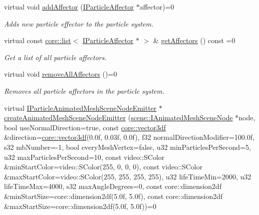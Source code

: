 \begin{DoxyCompactItemize}
virtual void \hyperlink{classirr_1_1scene_1_1IParticleSystemSceneNode_a401f5afbbb748878011c5ceb7d447f8b}{add\+Affector} (\hyperlink{classirr_1_1scene_1_1IParticleAffector}{I\+Particle\+Affector} $\ast$affector)=0
\begin{DoxyCompactList}\small\item\em Adds new particle effector to the particle system. \end{DoxyCompactList}\item 
virtual const \hyperlink{classirr_1_1core_1_1list}{core\+::list}$<$ \hyperlink{classirr_1_1scene_1_1IParticleAffector}{I\+Particle\+Affector} $\ast$ $>$ \& \hyperlink{classirr_1_1scene_1_1IParticleSystemSceneNode_a3a9159e6ec5869814fdf879c5a7c41a3}{get\+Affectors} () const =0
\begin{DoxyCompactList}\small\item\em Get a list of all particle affectors. \end{DoxyCompactList}\item 
\mbox{\label{classirr_1_1scene_1_1IParticleSystemSceneNode_a96df4c07ee0c480cc2e51e157be308c6}} 
virtual void \hyperlink{classirr_1_1scene_1_1IParticleSystemSceneNode_a96df4c07ee0c480cc2e51e157be308c6}{remove\+All\+Affectors} ()=0
\begin{DoxyCompactList}\small\item\em Removes all particle affectors in the particle system. \end{DoxyCompactList}\item 
virtual \hyperlink{classirr_1_1scene_1_1IParticleAnimatedMeshSceneNodeEmitter}{I\+Particle\+Animated\+Mesh\+Scene\+Node\+Emitter} $\ast$ \hyperlink{classirr_1_1scene_1_1IParticleSystemSceneNode_a1459245186d570f81f6c7ff78ddd38db}{create\+Animated\+Mesh\+Scene\+Node\+Emitter} (\hyperlink{classirr_1_1scene_1_1IAnimatedMeshSceneNode}{scene\+::\+I\+Animated\+Mesh\+Scene\+Node} $\ast$node, bool use\+Normal\+Direction=true, const \hyperlink{namespaceirr_1_1core_ae6e2b2a6c552833ebbd5b7463d03586b}{core\+::vector3df} \&direction=\hyperlink{namespaceirr_1_1core_ae6e2b2a6c552833ebbd5b7463d03586b}{core\+::vector3df}(0.\+0f, 0.\+03f, 0.\+0f), f32 normal\+Direction\+Modifier=100.\+0f, s32 mb\+Number=-\/1, bool every\+Mesh\+Vertex=false, u32 min\+Particles\+Per\+Second=5, u32 max\+Particles\+Per\+Second=10, const video\+::\+S\+Color \&min\+Start\+Color=video\+::\+S\+Color(255, 0, 0, 0), const video\+::\+S\+Color \&max\+Start\+Color=video\+::\+S\+Color(255, 255, 255, 255), u32 life\+Time\+Min=2000, u32 life\+Time\+Max=4000, s32 max\+Angle\+Degrees=0, const core\+::dimension2df \&min\+Start\+Size=core\+::dimension2df(5.\+0f, 5.\+0f), const core\+::dimension2df \&max\+Start\+Size=core\+::dimension2df(5.\+0f, 5.\+0f))=0

\end{DoxyCompactItemize}
